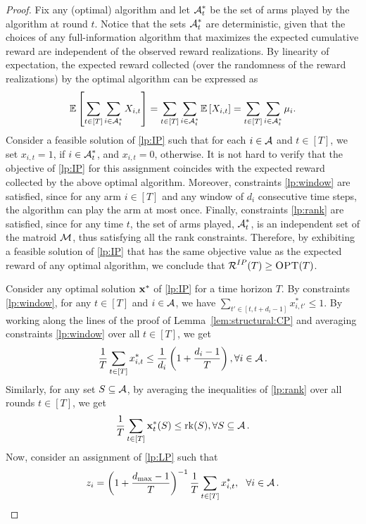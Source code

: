 \begin{proof}
Fix any (optimal) algorithm and let $\operatorname{\mathcal{A}}^{*}_t$ be the set of arms played by the algorithm at round $t$. Notice that the sets $\operatorname{\mathcal{A}}^{*}_t$ are deterministic, given that the choices of any full-information algorithm that maximizes the expected cumulative reward are independent of the observed reward realizations. By linearity of expectation, the expected reward collected (over the randomness of the reward realizations) by the optimal algorithm can be expressed as 
\begin{align*}
    \mathop{\underset{}{\mathbb{E}}\left[\sum_{t \in [T]} \sum_{i \in \operatorname{\mathcal{A}}^{*}_t} X_{i,t}\right]} = \sum_{t \in [T]} \sum_{i \in \operatorname{\mathcal{A}}^{*}_t} \mathop{\underset{}{\mathbb{E}}\left[X_{i,t}\right]} = \sum_{t \in [T]} \sum_{i \in \operatorname{\mathcal{A}}^{*}_t} \mu_i.
\end{align*}
Consider a feasible solution of \eqref{lp:IP} such that for each $i \in \operatorname{\mathcal{A}}$ and $t \in [T]$, we set $x_{i,t} = 1$, if $i \in \operatorname{\mathcal{A}}^{*}_t$, and $x_{i,t}=0$, otherwise. It is not hard to verify that the objective of \eqref{lp:IP} for this assignment coincides with the expected reward collected by the above optimal algorithm. Moreover, constraints \eqref{lp:window} are satisfied, since for any arm $i \in [T]$ and any window of $d_i$ consecutive time steps, the algorithm can play the arm at most once. Finally, constraints \eqref{lp:rank} are satisfied, since for any time $t$, the set of arms played, $\operatorname{\mathcal{A}}^{*}_t$, is an independent set of the matroid $\operatorname{\mathcal{M}}$, thus satisfying all the rank constraints. Therefore, by exhibiting a feasible solution of \eqref{lp:IP} that has the same objective value as the expected reward of any optimal algorithm, we conclude that $\operatorname{\mathcal{R}}^{IP}(T) \geq \textsc{OPT}(T)$.


Consider any optimal solution $\operatorname{\mathbf{x}}^*$ of \eqref{lp:IP} for a time horizon $T$. By constraints \eqref{lp:window}, for any $t \in [T]$ and $i \in \operatorname{\mathcal{A}}$, we have $\sum_{t' \in [t,t+d_i-1]} x^*_{i,t'} \leq 1$. By working along the lines of the proof of Lemma~\ref{lem:structural:CP} and averaging constraints \eqref{lp:window} over all $t \in [T]$, we get
\begin{align}
    \frac{1}{T}\sum_{t \in [T]} x^*_{i,t} \leq \frac{1}{d_i} \left(1 + \frac{d_i-1}{T}\right), \forall i \in \operatorname{\mathcal{A}} \label{eq:flp:window}. 
\end{align}
Similarly, for any set $S \subseteq \operatorname{\mathcal{A}}$, by averaging the inequalities of \eqref{lp:rank} over all rounds $t \in [T]$, we get
\begin{align}
    \frac{1}{T}\sum_{t \in [T]} \operatorname{\mathbf{x}}^*_t(S) \leq \operatorname{rk}(S), \forall S \subseteq \operatorname{\mathcal{A}}. \label{eq:flp:rank}
\end{align}
Now, consider an assignment of \eqref{lp:LP} such that
\begin{align*}
z_i = \left(1 + \frac{d_{\max}-1}{T}\right)^{-1} \frac{1}{T} \sum_{t \in [T]} x^*_{i,t},~~\forall i \in \operatorname{\mathcal{A}}.    
\end{align*}


\end{proof}
